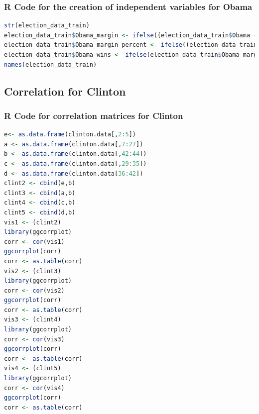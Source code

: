 \documentclass[11pt]{article}
\begin{document}
\subsubsection{R Code for the creation of independent variables for Obama}
\begin{lstlisting}[language=R]
str(election_data_train)
election_data_train$Obama_margin <- ifelse((election_data_train$Obama - election_data_train$Clinton)>0,1,0)
election_data_train$Obama_margin_percent <- ifelse((election_data_train$Obama_margin/election_data_train$TotalVote)>0,1,0)
election_data_train$Obama_wins <- ifelse(election_data_train$Obama_margin >0, 1,0)
names(election_data_train)
\end{lstlisting}




\subsection{Correlation for Clinton}
\subsubsection{R Code for correlation matrices for Clinton}
\begin{lstlisting}[language=R]
e<- as.data.frame(clinton.data[,2:5])
a <- as.data.frame(clinton.data[,7:27])
b <- as.data.frame(clinton.data[,42:44])
c <- as.data.frame(clinton.data[,29:35])
d <- as.data.frame(clinton.data[36:42])
clint2 <- cbind(e,b)
clint3 <- cbind(a,b)
clint4 <- cbind(c,b)
clint5 <- cbind(d,b)
vis1 <- (clint2)
library(ggcorrplot)
corr <- cor(vis1)
ggcorrplot(corr)
corr <- as.table(corr)
vis2 <- (clint3)
library(ggcorrplot)
corr <- cor(vis2)
ggcorrplot(corr)
corr <- as.table(corr)
vis3 <- (clint4)
library(ggcorrplot)
corr <- cor(vis3)
ggcorrplot(corr)
corr <- as.table(corr)
vis4 <- (clint5)
library(ggcorrplot)
corr <- cor(vis4)
ggcorrplot(corr)
corr <- as.table(corr)
\end{lstlisting}
\end{document}
